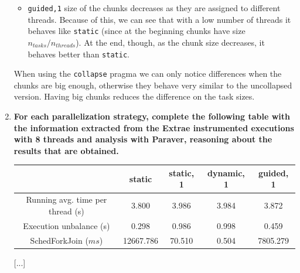 \documentclass[a4paper,11pt]{article}
\begin{document}
\begin{enumerate}
\begin{itemize}
\item \texttt{guided,1} size of the chunks decreases as they are
  assigned to different threads. Because of this, we can see that with
  a low number of threads it behaves like \texttt{static} (since at
  the beginning chunks have size ${n_{tasks}}/{n_{threads}}$). At the
  end, though, as the chunk size decreases, it behaves better than
  \texttt{static}.

\end{itemize}

When using the \texttt{collapse} pragma we can only notice differences when the chunks
are big enough, otherwise they behave very similar to the uncollapsed version.
Having big chunks reduces the difference on the task sizes.

\newpage
\setcounter{enumi}{4}
\item
\textbf{For each parallelization strategy, complete the following table with the information extracted from
    the Extrae instrumented executions with 8 threads and analysis with Paraver, reasoning about the
    results that are obtained.}
\begin{center}
\begin{tabular}{| c || c | c | c | c |}
\hline
\textbf{} & \textbf{static} & \textbf{static, 1} & \textbf{dynamic, 1} & \textbf{guided, 1}
\\
\hline
\hline
Running avg. time per thread (s) & 3.800 & 3.986 & 3.984 & 3.872
\\
\hline
Execution unbalance (s) & 0.298 & 0.986 & 0.998 & 0.459
\\
\hline
SchedForkJoin ($ms$) & 12667.786 & 70.510 & 0.504 & 7805.279
\\
\hline
\end{tabular}
\end{center}
[...]
\end{enumerate}
\end{document}
